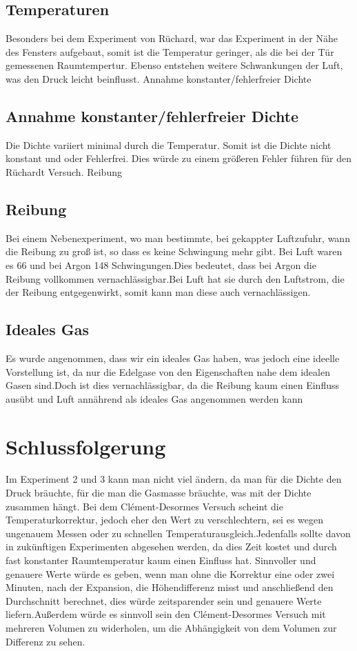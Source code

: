 \documentclass[bibliography=totocnumbered]{scrartcl}
\begin{document}
	\subsection{Temperaturen}
	Besonders bei dem Experiment von Rüchard, war das Experiment in der Nähe des Fensters aufgebaut, somit ist die Temperatur geringer, als die bei der Tür gemessenen Raumtempertur. Ebenso entstehen weitere Schwankungen der Luft, was den Druck leicht beinflusst.
	Annahme konstanter/fehlerfreier Dichte\\
	\subsection{Annahme konstanter/fehlerfreier Dichte}
	Die Dichte variiert minimal durch die Temperatur. Somit ist die Dichte nicht konstant und oder Fehlerfrei. Dies würde zu einem größeren Fehler führen für den Rüchardt Versuch.
	Reibung\\
	\subsection{Reibung}
	Bei einem Nebenexperiment, wo man bestimmte, bei gekappter Luftzufuhr, wann die Reibung zu groß ist, so dass es keine Schwingung mehr gibt.
	Bei Luft waren es 66 und bei Argon 148 Schwingungen.Dies bedeutet, dass bei Argon die Reibung vollkommen vernachlässigbar.Bei Luft hat sie durch den Luftstrom, die der Reibung entgegenwirkt, somit kann man diese auch vernachlässigen.\\
	
	\subsection{Ideales Gas}
	Es wurde angenommen, dass wir ein ideales Gas haben, was jedoch eine ideelle Vorstellung ist, da nur die Edelgase von den Eigenschaften nahe dem idealen Gasen sind.Doch ist dies vernachlässigbar, da die Reibung kaum einen Einfluss ausübt und Luft annährend als ideales Gas angenommen werden kann
	
	\section{Schlussfolgerung}
	Im Experiment 2 und 3 kann man nicht viel ändern, da man für die Dichte den Druck bräuchte, für die man die Gasmasse bräuchte, was mit der Dichte zusammen hängt.
	Bei dem Clément-Desormes Versuch scheint die Temperaturkorrektur, jedoch eher den Wert zu verschlechtern, sei es wegen ungenauem Messen oder zu schnellen Temperaturausgleich.Jedenfalls sollte davon in zukünftigen Experimenten abgesehen werden, da dies Zeit kostet und durch fast konstanter Raumtemperatur kaum einen Einfluss hat.
	Sinnvoller und genauere Werte würde es geben, wenn man ohne die Korrektur eine oder zwei Minuten, nach der Expansion, die Höhendifferenz misst und anschließend den Durchschnitt berechnet, dies würde zeitsparender sein und genauere Werte liefern.Außerdem würde es sinnvoll sein den Clément-Desormes Versuch mit mehreren Volumen zu widerholen, um die Abhängigkeit von dem Volumen zur Differenz zu sehen.
	\newpage
     \appendix
\end{document}
